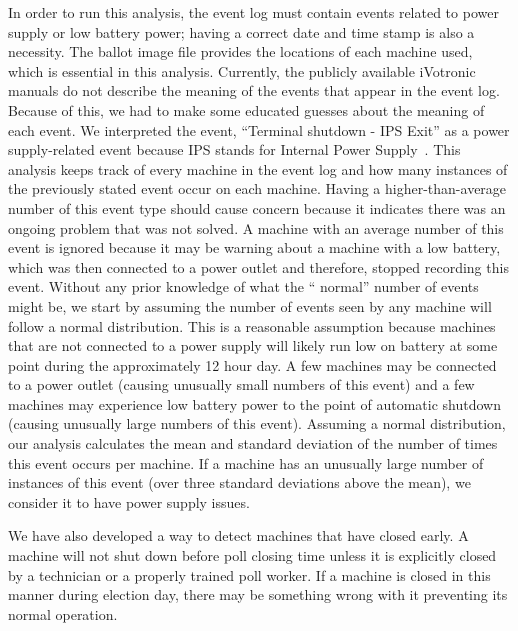 In order to run this analysis, the event log must contain events related to
power supply or low battery power; having a correct date and time stamp is also
a necessity.  The ballot image file provides the locations of each machine used,
which is essential in this analysis. Currently, the publicly available iVotronic
manuals do not describe the meaning of the events that appear in the event log.
Because of this, we had to make some educated guesses about the meaning of each
event.  We interpreted the event, \textquotedblleft Terminal shutdown - IPS
Exit\textquotedblright \hspace{1 mm} as a power supply-related event because IPS
stands for Internal Power Supply~\cite{email2010}.  This analysis keeps track of
every machine in the event log and how many instances of the previously stated
event occur on each machine.  Having a higher-than-average number of this event
type should cause concern because it indicates there was an ongoing problem that
was not solved. A machine with an average number of this event is ignored
because it may be warning about a machine with a low battery, which was then
connected to a power outlet and therefore, stopped recording this event. 
Without any prior knowledge of what the \textquotedblleft
normal\textquotedblright \hspace{1 mm} number of events might be, we start by
assuming the number of events seen by any machine will follow a normal
distribution. This is a reasonable assumption because machines that are not
connected to a power supply will likely run low on battery at some point during
the approximately 12 hour day. A few machines may be connected to a power outlet
(causing unusually small numbers of this event) and a few machines may
experience low battery power to the point of automatic shutdown (causing
unusually large numbers of this event).  Assuming a normal distribution, our
analysis calculates the mean and standard deviation of the number of times this
event occurs per machine.  If a machine has an unusually large number of
instances of this event (over three standard deviations above the mean), we
consider it to have power supply issues.

We have also developed a way to detect machines that have closed early. A
machine will not shut down before poll closing time unless it is explicitly
closed by a technician or a properly trained poll worker. If a machine is closed
in this manner during election day, there may be something wrong with it
preventing its normal operation.
                  

